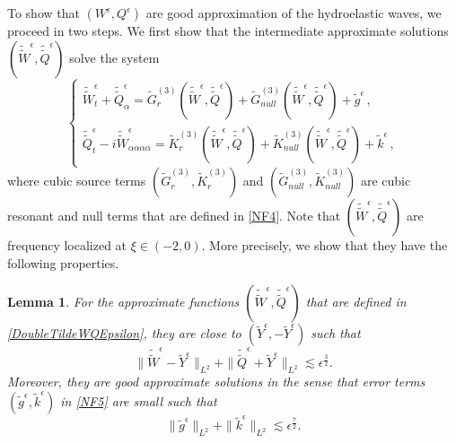 \documentclass[12pt]{amsart}
\newtheorem{lemma}[theorem]{Lemma}
\theoremstyle{remark}
\theoremstyle{definition}
\numberwithin{equation}{section}
\newcommand{\al}{\alpha}
\newcommand{\f}{\frac}
\begin{document}
To show that $(W^\epsilon, Q^\epsilon)$ are good approximation of the hydroelastic waves, we proceed in two steps.
We first show that the intermediate approximate solutions 
 $(\tilde{\tilde{W}}^\epsilon, \tilde{\tilde{Q}}^\epsilon)$ solve the system
 \begin{equation}\label{NF5}
\begin{cases}		\tilde{\tilde{W}}^\epsilon_t+\tilde{\tilde{Q}}^\epsilon_{\al}=\tilde{G}_r^{(3)}(\tilde{\tilde{W}}^\epsilon, \tilde{\tilde{Q}}^\epsilon)+\tilde{G}_{null}^{(3)}(\tilde{\tilde{W}}^\epsilon, \tilde{\tilde{Q}}^\epsilon)+ \tilde{g}^{\epsilon}\,,\\
\tilde{\tilde{Q}}^\epsilon_t-i\tilde{\tilde{W}}^\epsilon_{\al\al\al\al}= \tilde{K}_r^{(3)}(\tilde{\tilde{W}}^\epsilon, \tilde{\tilde{Q}}^\epsilon)+  \tilde{K}_{null}^{(3)}(\tilde{\tilde{W}}^\epsilon, \tilde{\tilde{Q}}^\epsilon)+ \tilde{k}^{\epsilon}\,,
\end{cases}
\end{equation}
where cubic source terms $(\tilde{G}_r^{(3)}, \tilde{K}_r^{(3)})$ and $(\tilde{G}_{null}^{(3)}, \tilde{K}_{null}^{(3)})$ are cubic resonant and null terms that are defined in \eqref{NF4}.
Note that $(\tilde{\tilde{W}}^\epsilon, \tilde{\tilde{Q}}^\epsilon)$ are frequency localized at $\xi \in (-2, 0)$. 
More precisely, we show that they have the following properties.
\begin{lemma}
For the approximate functions $(\tilde{\tilde{W}}^\epsilon, \tilde{\tilde{Q}}^\epsilon)$ that are defined in \eqref{DoubleTildeWQEpsilon}, they are close to $(\tilde{Y}^\epsilon, - \tilde{Y}^\epsilon)$ such that
\begin{equation} \label{DoulbleTildeWQYdiff}
 \|\tilde{\tilde{W}}^\epsilon - \tilde{Y}^\epsilon\|_{L^2} + \|\tilde{\tilde{Q}}^\epsilon + \tilde{Y}^\epsilon\|_{L^2} \lesssim \epsilon^\f32.
\end{equation}
Moreover, they are good approximate solutions in the sense that error terms $(\tilde{g}^\epsilon, \tilde{k}^\epsilon)$ in \eqref{NF5} are small such that
\begin{equation} \label{TildegkEst}
 \|\tilde{g}^\epsilon\|_{L^2} + \|\tilde{k}^\epsilon\|_{L^2} \lesssim \epsilon^{\f72}. 
\end{equation}
\end{lemma}
\end{document}
